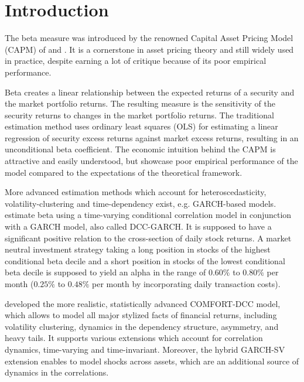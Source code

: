 \documentclass[11pt,a4paper]{article}
\begin{document}
\section{Introduction}

The beta measure was introduced by the renowned Capital Asset Pricing Model (CAPM) of  and . It is a cornerstone in asset pricing theory and still widely used in practice, despite earning a lot of critique because of its poor empirical performance.

Beta creates a linear relationship between the expected returns of a security and the market portfolio returns. The resulting measure is the sensitivity of the security returns to changes in the market portfolio returns. The traditional estimation method uses ordinary least squares (OLS) for estimating a linear regression of security excess returns against market excess returns, resulting in an unconditional beta coefficient. The economic intuition behind the CAPM is attractive and easily understood, but  showcase poor empirical performance of the model compared to the expectations of the theoretical framework.

More advanced estimation methods which account for heteroscedasticity, volatility-clustering and time-dependency exist, e.g. GARCH-based models.  estimate beta using a time-varying conditional correlation model in conjunction with a GARCH model, also called DCC-GARCH. It is supposed to have a significant positive relation to the cross-section of daily stock returns. A market neutral investment strategy taking a long position in stocks of the highest conditional beta decile and a short position in stocks of the lowest conditional beta decile is supposed to yield an alpha in the range of $0.60\%$ to $0.80\%$ per month ($0.25\%$ to $0.48\%$ per month by incorporating daily transaction costs).

 developed the more realistic, statistically advanced COMFORT-DCC model, which allows to model all major stylized facts of financial returns, including volatility clustering, dynamics in the dependency structure, asymmetry, and heavy tails. It supports various extensions which account for correlation dynamics, time-varying and time-invariant. Moreover, the hybrid GARCH-SV extension enables to model shocks across assets, which are an additional source of dynamics in the correlations.
\end{document}

